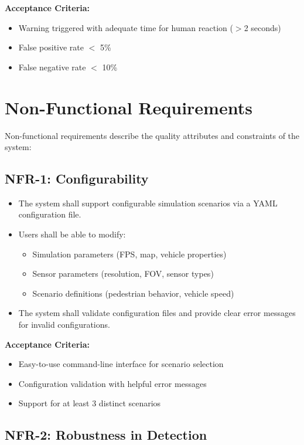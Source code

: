 \textbf{Acceptance Criteria:}
\begin{itemize}
    \item Warning triggered with adequate time for human reaction ($>$2 seconds)
    \item False positive rate $<$ 5\%
    \item False negative rate $<$ 10\%
\end{itemize}

\section{Non-Functional Requirements}

Non-functional requirements describe the quality attributes and constraints of the system:

\subsection{NFR-1: Configurability}

\begin{itemize}
    \item The system shall support configurable simulation scenarios via a YAML configuration file.
    \item Users shall be able to modify:
    \begin{itemize}
        \item Simulation parameters (FPS, map, vehicle properties)
        \item Sensor parameters (resolution, FOV, sensor types)
        \item Scenario definitions (pedestrian behavior, vehicle speed)
    \end{itemize}
    \item The system shall validate configuration files and provide clear error messages for invalid configurations.
\end{itemize}

\textbf{Acceptance Criteria:}
\begin{itemize}
    \item Easy-to-use command-line interface for scenario selection
    \item Configuration validation with helpful error messages
    \item Support for at least 3 distinct scenarios
\end{itemize}

\subsection{NFR-2: Robustness in Detection}

